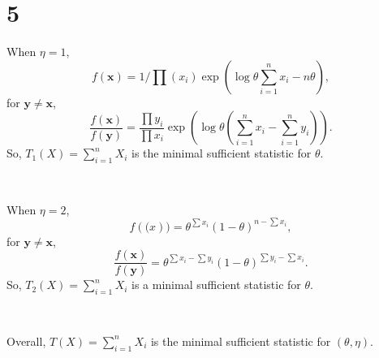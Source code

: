 \documentclass[en,12pt]{elegantpaper}
\begin{document}
    \section*{5}
    \noindent When $\eta=1$, 
    \[
        f(\mathbf{x})=1\Big/\prod(x_i)\exp\left(\log\theta\sum_{i=1}^nx_i-n\theta\right), 
    \]
    for $\mathbf{y}\neq\mathbf{x}$, 
    \[
        \frac{f(\mathbf{x})}{f(\mathbf{y})}=\frac{\prod y_i}{\prod x_i}\exp\left(\log\theta \left(\sum_{i=1}^nx_i-\sum_{i=1}^ny_i\right)\right). 
    \]
    So, $T_1(X)=\sum_{i=1}^nX_i$ is the minimal sufficient statistic for $\theta$. 
    
    \, 

    \noindent When $\eta=2$, 
    \[
        f(\mathbf(x))=\theta^{\sum x_i}(1-\theta)^{n-\sum x_i}, 
    \]
    for $\mathbf{y}\neq\mathbf{x}$, 
    \[
        \frac{f(\mathbf{x})}{f(\mathbf{y})}=\theta^{\sum x_i-\sum y_i}(1-\theta)^{\sum y_i-\sum x_i}. 
    \]
    So, $T_2(X)=\sum_{i=1}^nX_i$ is a minimal sufficient statistic for $\theta$. 

    \,

    \noindent Overall, $T(X)=\sum_{i=1}^{n}X_i$ is the minimal sufficient statistic for $(\theta, \eta)$. 
\end{document}
